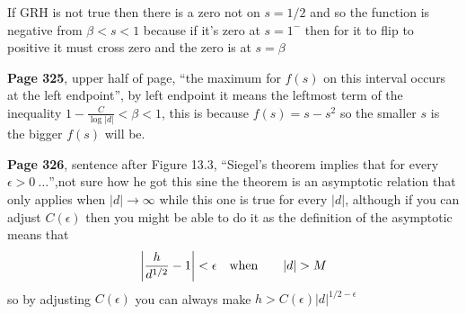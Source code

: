 \documentclass[aps,preprint,preprintnumbers,nofootinbib,showpacs,prd]{revtex4-1}
\newcommand{\nbea}{\begin{eqnarray*}}
\newcommand{\neea}{\end{eqnarray*}}
\begin{document}
If GRH is not true then there is a zero not on $s=1/2$ and so the function is negative from $\beta < s < 1$ because if it's zero at $s=1^-$ then for it to flip to positive it must cross zero and the zero is at $s=\beta$

{\bf Page 325}, upper half of page, ``the maximum for $f(s)$ on this interval occurs at the left endpoint'', by left endpoint it means the leftmost term of the inequality $1 - \frac{C}{\log|d|} < \beta < 1$, this is because $f(s) = s - s^2$ so the smaller $s$ is the bigger $f(s)$ will be.

{\bf Page 326}, sentence after Figure 13.3, ``Siegel's theorem implies that for every $\epsilon > 0 ~\ldots$'',not sure how he got this sine the theorem is an asymptotic relation that only applies when $|d|\to\infty$ while this one is true for every $|d|$, although if you can adjust $C(\epsilon)$ then you might be able to do it as the definition of the asymptotic means that
%
\nbea
\left|\frac{h}{d^{1/2}} - 1\right| < \epsilon &{\rm~~~when~~~}& |d| > M
\neea
%
so by adjusting $C(\epsilon)$ you can always make $h > C(\epsilon) |d|^{1/2-\epsilon}$
\end{document}
